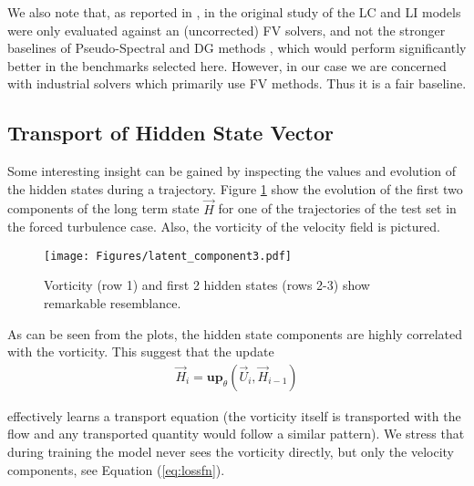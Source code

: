 We also note that, as reported in \cite{mcgreivy2024weak}, in the original study of \citeauthor{kochkov2021machine} the LC and LI models were only evaluated against an (uncorrected) FV solvers, and not the stronger baselines of Pseudo-Spectral \cite{shen2011spectral} and DG methods \cite{cockburn2012discontinuous}, which would perform significantly better in the benchmarks selected here. However, in our case we are concerned with industrial solvers which primarily use FV methods. Thus it is a fair baseline.

\subsection{Transport of Hidden State Vector}
\label{sec:latent_discussion}

Some interesting insight can be gained by inspecting the values and evolution of the hidden states during a trajectory. Figure \ref{fig:vort_and_lat} show the evolution of the first two components of the long term state $\vec{H}$ for one of the trajectories of the test set in the forced turbulence case. Also, the vorticity of the velocity field is pictured. 


\begin{figure}[h!]
    \centering
    \texttt{[image: Figures/latent\_component3.pdf]}
    \caption{Vorticity (row 1) and first 2 hidden states (rows 2-3) show remarkable resemblance.}
    \label{fig:vort_and_lat}
\end{figure}

As can be seen from the plots, the hidden state components are highly correlated with the vorticity. This suggest that the update
{\footnotesize
\begin{align}
    \vec{H}_{i} = \textbf{up}_{\theta} (\vec{U}_i, \vec{H}_{i-1} )
    \label{eq:latent_update}
\end{align}}

\noindent 
effectively learns a transport equation (the vorticity itself is transported with the flow and any transported quantity would follow a similar pattern). We stress that during training the model never sees the vorticity directly, but only the velocity components, see Equation (\ref{eq:lossfn}).

